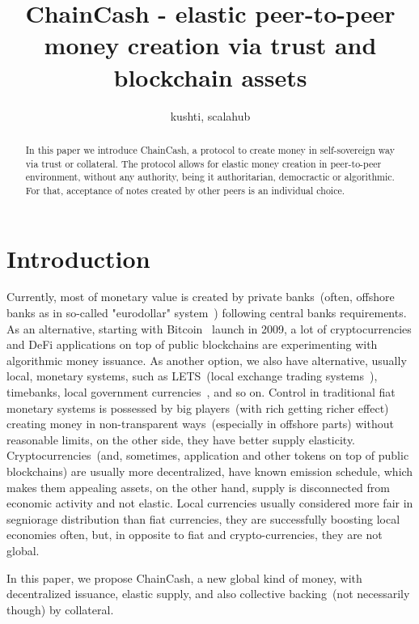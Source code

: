 \documentclass{article}   %
\newcommand{\cc}{ChainCash}
\begin{document}
\title{ChainCash - elastic peer-to-peer money creation via trust and blockchain assets}
\author{kushti, scalahub}


\maketitle

\begin{abstract}
In this paper we introduce ChainCash, a protocol to create money in self-sovereign way via trust or collateral. The
protocol allows for elastic money creation in peer-to-peer environment, without any authority, being it authoritarian,
democractic or algorithmic. For that, acceptance of notes created by other peers is an individual choice.
\end{abstract}


\section{Introduction}

Currently, most of monetary value is created by private banks~(often, offshore banks as in so-called "eurodollar" system~\cite{machlup1970euro}) following central banks requirements. As an alternative, starting with Bitcoin~\cite{nakamoto2008peer} launch in 2009, a lot of cryptocurrencies 
and DeFi applications on top of public blockchains are experimenting with algorithmic money issuance. As another option, we also have alternative, usually local, monetary systems, such as LETS~(local exchange trading systems~\cite{williams1996new}), timebanks, local government currencies~\cite{unterguggenbercer1934end}, and so on. Control in traditional fiat monetary systems is possessed by big players~(with rich getting richer effect) creating money in non-transparent ways~(especially in offshore parts) without reasonable limits, on the other side, they have better supply elasticity. Cryptocurrencies~(and, sometimes, application and other tokens on top of public blockchains) are usually more decentralized, have known emission schedule, which makes them appealing assets, on the other hand, supply is disconnected from economic activity and not elastic. Local currencies usually considered more fair in segniorage distribution than fiat currencies, they are successfully boosting local economies often, but, in opposite to fiat and crypto-currencies, they are not global.

In this paper, we propose \cc{}, a new global kind of money, with decentralized issuance, elastic supply, and also collective backing~(not necessarily though) by collateral.
\end{document}
